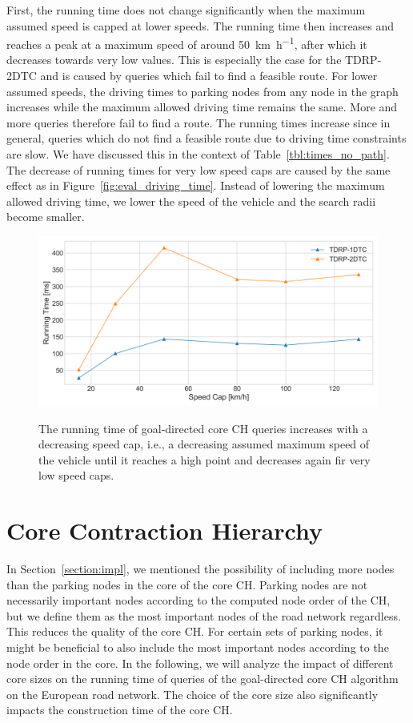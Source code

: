 First, the running time does not change significantly when the maximum assumed speed is capped at lower speeds. The running time then increases and reaches a peak at a maximum speed of around \SI[per-mode = symbol]{50}{\kilo\meter\per\hour}, after which it decreases towards very low values. This is especially the case for the TDRP-2DTC and is caused by queries which fail to find a feasible route. For lower assumed speeds, the driving times to parking nodes from any node in the graph increases while the maximum allowed driving time remains the same. More and more queries therefore fail to find a route. The running times increase since in general, queries which do not find a feasible route due to driving time constraints are slow. We have discussed this in the context of Table~\ref{tbl:times_no_path}. The decrease of running times for very low speed caps are caused by the same effect as in Figure~\ref{fig:eval_driving_time}. Instead of lowering the maximum allowed driving time, we lower the speed of the vehicle and the search radii become smaller.

\begin{figure}[hbtp]
	\centering
	\includegraphics[width=.95\textwidth]{plots/thesis_speed_cap.png}
	\label{fig:truck_speed_limit}
	\caption{The running time of goal-directed core CH queries increases with a decreasing speed cap, i.e., a decreasing assumed maximum speed of the vehicle until it reaches a high point and decreases again fir very low speed caps.}
\end{figure}

\section{Core Contraction Hierarchy}
In Section~\ref{section:impl}, we mentioned the possibility of including more nodes than the parking nodes in the core of the core CH. Parking nodes are not necessarily important nodes according to the computed node order of the CH, but we define them as the most important nodes of the road network regardless. This reduces the quality of the core CH. For certain sets of parking nodes, it might be beneficial to also include the most important nodes according to the node order in the core. In the following, we will analyze the impact of different core sizes on the running time of queries of the goal-directed core CH algorithm on the European road network. The choice of the core size also significantly impacts the construction time of the core CH.

